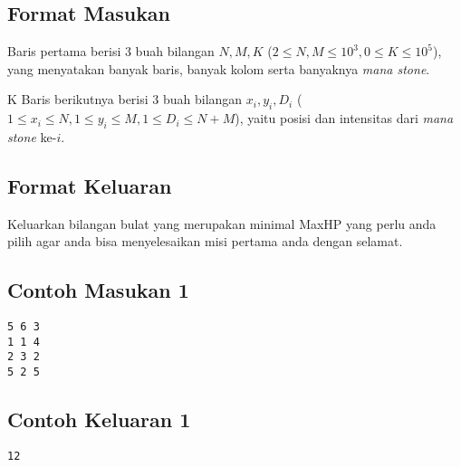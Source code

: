 \documentclass{article}
\begin{document}
\subsection*{Format Masukan}

Baris pertama berisi 3 buah bilangan $N, M, K$ ($2 \leq N, M \leq 10^3, 0 \leq K \leq 10^5$), yang menyatakan banyak baris, banyak kolom serta banyaknya \textit{mana stone}. 

K Baris berikutnya berisi 3 buah bilangan $x_i, y_i, D_i$ ($1 \leq x_i \leq N, 1 \leq y_i \leq M, 1 \leq D_i \leq N+M$), yaitu posisi dan intensitas dari \textit{mana stone} ke-$i$.

\subsection*{Format Keluaran}
Keluarkan bilangan bulat yang merupakan minimal MaxHP yang perlu anda pilih agar anda bisa menyelesaikan misi pertama anda dengan selamat.


\begin{multicols}{2}
\subsection*{Contoh Masukan 1}
\begin{lstlisting}
5 6 3
1 1 4
2 3 2
5 2 5
\end{lstlisting}
\columnbreak
\subsection*{Contoh Keluaran 1}
\begin{lstlisting}
12
\end{lstlisting}
\vfill
\null
\end{multicols}
\end{document}
